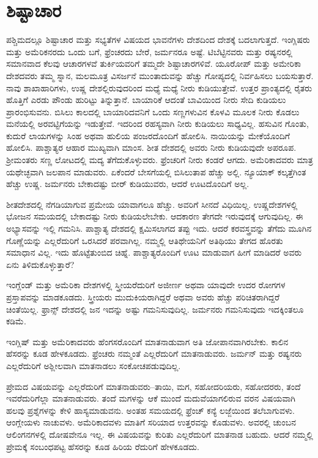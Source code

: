 \section{ಶಿಷ್ಟಾಚಾರ}

ಪಶ್ಚಿಮದಲ್ಲೂ ಶಿಷ್ಟಾಚಾರ ಮತ್ತು ಸಭ್ಯತೆಗಳ ವಿಷಯದ ಭಾವನೆಗಳು ದೇಶದಿಂದ ದೇಶಕ್ಕೆ ಬದಲಾಗುತ್ತದೆ. ಇಂಗ್ಲಿಷರು ಮತ್ತು ಅಮೆರಿಕನರದು ಒಂದು ಬಗೆ, ಫ್ರೆಂಚರದು ಬೇರೆ, ಜರ್ಮನರೂ ಅಷ್ಟೆ. ಟಿಬೆಟ್ಟಿನವರು ಮತ್ತು ರಷ್ಯನರಲ್ಲಿ ಸಮಾನವಾದ ಕೆಲವು ಆಚಾರಗಳವೆ ತುರ್ಕಿಯವರಿಗೆ ತಮ್ಮದೇ ಶಿಷ್ಟಾಚಾರಗಳಿವೆ. ಯೂರೋಪ್​ ಮತ್ತು ಅಮೇರಿಕಾ ದೇಶದವರು ತಮ್ಮ ಸ್ನಾನ, ಮಲಮೂತ್ರ ವಿಸರ್ಜನೆ ಮುಂತಾದುವನ್ನು ಹೆಚ್ಚು ಗೋಪ್ಯದಲ್ಲಿ ನಿರ್ವಹಿಸಲು ಬಯಸುತ್ತಾರೆ. ನಾವು ಶಾಖಾಹಾರಿಗಳು, ಉಷ್ಣ ದೇಶಲ್ಲಿರುವುದರಿಂದ ಮಧ್ಯೆ ಮಧ್ಯೆ ನೀರು ಕುಡಿಯುತ್ತೇವೆ. ಉತ್ತರ ಪ್ರಾಂತ್ಯದಲ್ಲಿ ರೈತರು ಹೊತ್ತಿಗೆ ಎರಡು ಪೌಂಡು ಹುರಿಟ್ಟು ತಿನ್ನುತ್ತಾನೆ. ಬಾಯಾರಿಕೆ ಆದಂತೆ ಬಾವಿಯಿಂದ ನೀರು ಸೇದಿ ಕುಡಿಯಲು ಪ್ರಾರಂಭಿಸುವನು. ಬಿಸಿಲು ಕಾಲದಲ್ಲಿ ಬಾಯಾರಿದವನಿಗೆ ಒಂದು ಸಣ್ಣಗಳುವಿನ ಕೊಳವಿ ಮೂಲಕ ನೀರು ಕೊಡಲು ಮನೆಯಲ್ಲಿ ಅರವಟ್ಟಿಗೆಯನ್ನು ಇಡುತ್ತೇವೆ. ಇದರಿಂದ ರಹಸ್ಯವಾಗಿ ನೀರು ಕುಡಿಯಲು ಸಾಧ್ಯವಿಲ್ಲ. ಹಸುವಿನ ಗೊಂತು, ಕುದುರೆ ಲಾಯಗಳನ್ನು ಸಿಂಹ ಅಥವಾ ಹುಲಿಯ ಪಂಜರದೊಂದಿಗೆ ಹೋಲಿಸಿ. ನಾಯಿಯನ್ನು ಮೇಕೆಯೊಂದಿಗೆ ಹೋಲಿಸಿ. ಪಾಶ್ಚಾತ್ಯರ ಆಹಾರ ಮುಖ್ಯವಾಗಿ ಮಾಂಸ. ಶೀತ ದೇಶದಲ್ಲಿ ಅವರು ನೀರು ಕುಡಿಯವುದೇ ಅಪರೂಪ. ಶ‍್ರೀಮಂತರು ಸಣ್ಣ ಲೋಟದಲ್ಲಿ ಮದ್ಯ ತೆಗೆದುಕೊಳ್ಳುವರು. ಫ್ರೆಂಚರಿಗೆ ನೀರು ಕಂಡರೆ ಆಗದು. ಅಮೆರಿಕಾದವರು ಮಾತ್ರ ಯಥೇಚ್ಛವಾಗಿ ಜಲಪಾನ ಮಾಡುವರು. ಏಕೆಂದರೆ ಬೇಸಗೆಯಲ್ಲಿ ಬಿಸಿಲುತಾಪ ಹೆಚ್ಚು ಅಲ್ಲಿ. ನ್ಯೂಯಾಕ್​ ಕಲ್ಕತ್ತೆಗಿಂತ ಹೆಚ್ಚು ಉಷ್ಣ. ಜರ್ಮನರು ಬೇಕಾದಷ್ಟು ಬೀರ್​ ಕುಡಿಯುವರು, ಆದರೆ ಊಟದೊಂದಿಗೆ ಅಲ್ಲ.

ಶೀತದೇಶದಲ್ಲಿ ನೆಗಡಿಯಾಗುವ ಪ್ರಮೇಯ ಯಾವಾಗಲೂ ಹೆಚ್ಚು. ಅವರಿಗೆ ಸೀನದೆ ವಿಧಿಯಿಲ್ಲ. ಉಷ್ಣದೇಶಗಳಲ್ಲಿ ಭೋಜನ ಸಮಯದಲ್ಲಿ ಬೇಕಾದಷ್ಟು ನೀರು ಕುಡಿಯಲೇಬೇಕು. ಆದಕಾರಣ ತೇಗದೇ ಇರುವುದಕ್ಕೆ ಆಗುವುದಿಲ್ಲ. ಈ ಅಭ್ಯಾಸವನ್ನು ಇಲ್ಲಿ ಗಮನಿಸಿ. ಪಾಶ್ಚಾತ್ಯ ದೇಶದಲ್ಲಿ ಕ್ಷಮಿಸಲಾಗದ ತಪ್ಪು ಇದು. ಆದರೆ ಕರವಸ್ತ್ರವನ್ನು ತೆಗೆದು ಮೂಗಿನ ಗೊಣ್ಣೆಯನ್ನು ಎಲ್ಲರೆದುರಿಗೆ ಒರಸಿದರೆ ಪರವಾಗಿಲ್ಲ. ನಮ್ಮಲ್ಲಿ ಆತಿಥೇಯನಿಗೆ ಅತಿಥಿಯು ತೇಗದ ಹೊರತು ಸಮಾಧಾನ ವಿಲ್ಲ. ಇದು ಹೊಟ್ಟೆತುಂಬಿದ ಚಿಹ್ನೆ. ಪಾಶ್ಚಾತ್ಯರೊಂದಿಗೆ ಊಟ ಮಾಡುವಾಗ ಹೀಗೆ ಮಾಡಿದರೆ ಅವರು ಏನು ತಿಳಿದುಕೊಳ್ಳುತ್ತಾರೆ?

ಇಂಗ್ಲೆಂಡ್​ ಮತ್ತು ಅಮೆರಿಕಾ ದೇಶಗಳಲ್ಲಿ ಸ್ತ್ರೀಯರೆದುರಿಗೆ ಅಜೀರ್ಣ ಅಥವಾ ಯಾವುದೇ ಉದರ ರೋಗಗಳ ಪ್ರಸ್ತಾಪವನ್ನು ಮಾಡಕೂಡದು. ಸ್ತ್ರೀಯರು ಮುದುಕಿಯರಾಗಿದ್ದರೆ ಅಥವಾ ಅವರು ಹೆಚ್ಚು ಪರಿಚಿತರಾಗಿದ್ದರೆ ಚಿಂತೆಯಿಲ್ಲ. ಫ್ರಾನ್ಸ್​ ದೇಶದಲ್ಲಿ ಜನ ಇದನ್ನು ಅಷ್ಟು ಗಮನಿಸುವುದಿಲ್ಲ. ಜರ್ಮನರು ಗಮನಿಸುವುದು ಇದಕ್ಕಿಂತಲೂ ಕಡಿಮೆ.

ಇಂಗ್ಲಿಷ್​ ಮತ್ತು ಅಮೆರಿಕಾದವರು ಹೆಂಗಸರೊಂದಿಗೆ ಮಾತನಾಡುವಾಗ ಅತಿ ಜೋಪಾನವಾಗಿರಬೇಕು. ಕಾಲಿನ ಹೆಸರನ್ನು ಕೂಡ ಹೇಳಕೂಡದು. ಫ್ರೆಂಚರು ನಮ್ಮಂತೆ ಎಲ್ಲರೆದುರಿಗೆ ಮಾತನಾಡುವರು. ಜರ್ಮನ್​ ಮತ್ತು ರಷ್ಯನರು ಎಲ್ಲರೆದುರಿಗೆ ಅಶ್ಲೀಲವಾಗಿ ಮಾತನಾಡಲು ಸಂಕೋಚಪಡುವುದಿಲ್ಲ.

ಪ್ರೇಮದ ವಿಷಯವನ್ನು ಎಲ್ಲರೆದುರಿಗೆ ಮಾತನಾಡುವರು–ತಾಯಿ, ಮಗ, ಸಹೋದರಿಯರು, ಸಹೋದರರು, ತಂದೆ ಇವರೆದುರಿಗೆಲ್ಲಾ ಮಾತನಾಡುವರು. ತಂದೆ ಮಗಳನ್ನು ಆಕೆ ಮುಂದೆ ಮದುವೆಯಾಗಲಿರುವ ವರನ ವಿಷಯವಾಗಿ ಹಲವು ಪ್ರಶ್ನೆಗಳನ್ನು ಕೇಳಿ ಹಾಸ್ಯಮಾಡುವನು. ಅಂತಹ ಸಮಯದಲ್ಲಿ ಫ್ರೆಂಚ್​ ಕನ್ಯೆ ಲಜ್ಜೆಯಿಂದ ತಲೆಬಾಗುವಳು. ಆಂಗ್ಲೇಯಳು ನಾಚುವಳು. ಅಮೆರಿಕಾದವಳು ಮಾತಿಗೆ ಸರಿಯಾದ ಉತ್ತರವನ್ನು ಕೊಡುವಳು. ಅವರಲ್ಲಿ ಚುಂಬನ ಆಲಿಂಗನಗಳಲ್ಲಿ ದೋಷವೇನೂ ಇಲ್ಲ. ಈ ವಿಷಯವನ್ನು ಕುರಿತು ಎಲ್ಲರೆದುರಿಗೆ ಮಾತನಾಡ ಬಹುದು. ಆದರೆ ನಮ್ಮಲ್ಲಿ ಪ್ರೇಮಕ್ಕೆ ಸಂಬಂಧಪಟ್ಟ ಹೆಸರನ್ನು ಕೂಡ ಹಿರಿಯ ರೆದುರಿಗೆ ಹೇಳಕೂಡದು.

